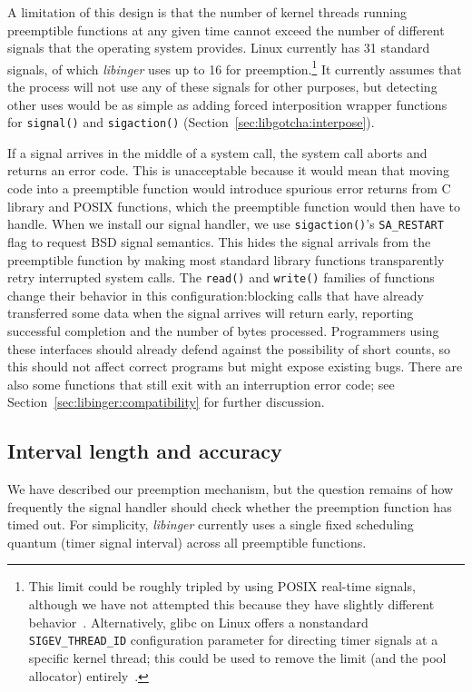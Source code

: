 A limitation of this design is that the number of kernel threads running preemptible
functions at any given time cannot exceed the number of different signals that the
operating system provides.  Linux currently has 31 standard signals, of which
\textit{libinger} uses up to 16 for preemption.\footnote{This limit could be roughly
tripled by using POSIX real-time signals, although we have not attempted this because
they have slightly different behavior~\cite{signal-manpage}.  Alternatively, glibc on
Linux offers a nonstandard \texttt{SIGEV\_THREAD\_ID} configuration parameter for
directing timer signals at a specific kernel thread; this could be used to remove the
limit (and the pool allocator) entirely~\cite{timercreate-manpage}.}  It currently
assumes that the process will not use any of these signals for other purposes, but
detecting other uses would be as simple as adding forced interposition wrapper
functions for \texttt{signal()} and \texttt{sigaction()}
(Section~\ref{sec:libgotcha:interpose}).

If a signal arrives in the middle of a system call, the system call aborts and
returns an error code.  This is unacceptable because it would mean that moving code
into a preemptible function would introduce spurious error returns from C library and
POSIX functions, which the preemptible function would then have to handle.  When we
install our signal handler, we use \texttt{sigaction()}'s \texttt{SA\_RESTART} flag
to request BSD signal semantics.  This hides the signal arrivals from the preemptible
function by making most standard library functions transparently retry interrupted
system calls.  The \texttt{read()} and \texttt{write()} families of functions change
their behavior in this configuration:\@ blocking calls that have already transferred
some data when the signal arrives will return early, reporting successful completion
and the number of bytes processed.  Programmers using these interfaces should already
defend against the possibility of short counts, so this should not affect correct
programs but might expose existing bugs.  There are also some functions that still
exit with an interruption error code; see Section~\ref{sec:libinger:compatibility}
for further discussion.


\subsection{Interval length and accuracy}
\label{sec:libinger:quantum}

We have described our preemption mechanism, but the question remains of how
frequently the signal handler should check whether the preemption function has timed
out.  For simplicity, \textit{libinger} currently uses a single fixed scheduling
quantum (timer signal interval) across all preemptible functions.

